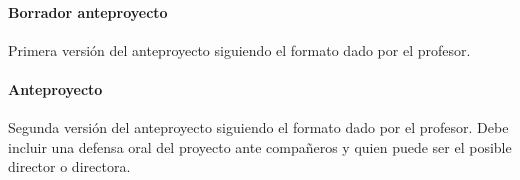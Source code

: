 \documentclass[]{article}
\let\oldparagraph\paragraph
\renewcommand{\paragraph}[1]{\oldparagraph{#1}\mbox{}}
\begin{document}
\paragraph{Borrador anteproyecto}\label{borrador-anteproyecto}

Primera versión del anteproyecto siguiendo el formato dado por el
profesor.

\paragraph{Anteproyecto}\label{anteproyecto}

Segunda versión del anteproyecto siguiendo el formato dado por el
profesor. Debe incluir una defensa oral del proyecto ante compañeros y
quien puede ser el posible director o directora.
\end{document}
